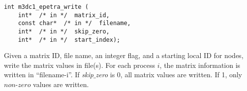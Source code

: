 \begin{verbatim}
int m3dc1_epetra_write (
    int*  /* in */  matrix_id, 
    const char*  /* in */  filename, 
    int*  /* in */  skip_zero,
    int*  /* in */  start_index);
\end{verbatim}\vspace{-.5cm}\hspace{1cm}
Given a matrix ID, file name, an integer flag, and a starting local ID for nodes, write the matrix values in file(s). For each process $i$, the matrix information is written in ``filename-i''. If \textit{skip$\_$zero} is 0, all matrix values are written. If 1, only $non$-$zero$ values are written.

